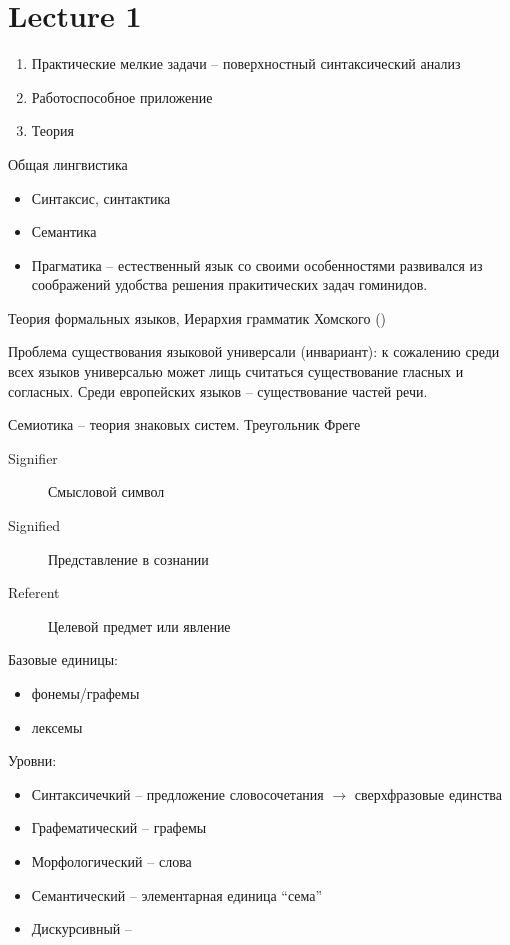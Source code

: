 

\section{Lecture 1} %
\label{sec:lecture_1}
\begin{enumerate}
	\item Практические мелкие задачи -- поверхностный синтаксический анализ
	\item Работоспособное приложение
	\item Теория
\end{enumerate}
Общая лингвистика \begin{itemize}
	\item Синтаксис, синтактика
	\item Семантика
	\item Прагматика -- естественный язык со своими особенностями развивался из соображений удобства решения пракитических задач гоминидов.
\end{itemize}	
Теория формальных языков, Иерархия грамматик Хомского ()


Проблема существования языковой универсали (инвариант):
к сожалению среди всех языков универсалью может лищь считаться существование гласных и согласных.
Среди европейских языков -- существование частей речи.

Семиотика -- теория знаковых систем.
Треугольник Фреге
\begin{description}
	\item[Signifier] Смысловой символ
	\item[Signified] Представление в сознании
	\item[Referent] Целевой предмет или явление
\end{description}

Базовые единицы:
\begin{itemize}
	\item фонемы/графемы
	\item лексемы
\end{itemize}

Уровни:
\begin{itemize}
	\item Синтаксичечкий -- предложение
		словосочетания $\to$ сверхфразовые единства
	\item Графематический -- графемы
	\item Морфологический -- слова
	\item Семантический -- элементарная единица ``сема''
	\item Дискурсивный -- 
\end{itemize}

